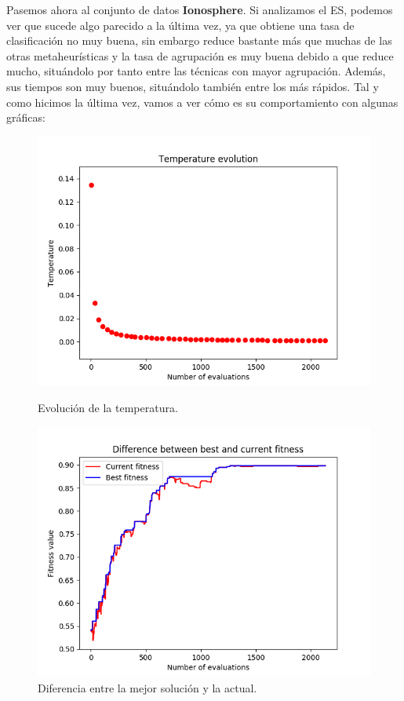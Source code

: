 \documentclass[11pt,a4paper]{article}
\begin{document}
Pasemos ahora al conjunto de datos \textbf{Ionosphere}. Si analizamos el ES, podemos ver que sucede algo parecido a la última
vez, ya que obtiene una tasa de clasificación no muy buena, sin embargo reduce bastante más que muchas de las otras metaheurísticas
y la tasa de agrupación es muy buena debido a que reduce mucho, situándolo por tanto entre las técnicas con mayor agrupación. Además,
sus tiempos son muy buenos, situándolo también entre los más rápidos. Tal y como hicimos la última vez, vamos a ver cómo es
su comportamiento con algunas gráficas:

\begin{figure}[H]
\centering
\begin{minipage}{.5\textwidth}
	\centering
	\includegraphics[scale=0.4]{img/ionosphere-sa-temp.png}
	\caption{Evolución de la temperatura.}
\end{minipage}%
\begin{minipage}{.5\textwidth}
	\centering
	\includegraphics[scale=0.4]{img/ionosphere-sa.png}
	\caption{Diferencia entre la mejor solución y la actual.}
\end{minipage}
\end{figure}
\end{document}
